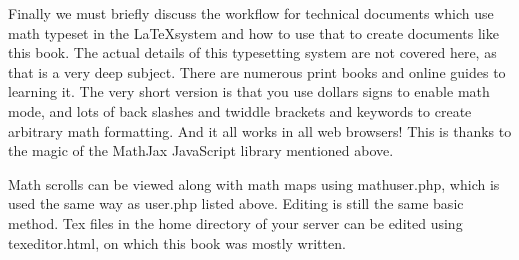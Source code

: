 Finally we must briefly discuss the workflow for technical documents which use math typeset in the \LaTeX system and how to use that to create documents like this book.  The actual details of this typesetting system are not covered here, as that is a very deep subject.  There are numerous print books and online guides to learning it.  The very short version is that you use dollars signs to enable math mode, and lots of back slashes and twiddle brackets and keywords to create arbitrary math formatting.  And it all works in all web browsers! This is thanks to the magic of the MathJax JavaScript library mentioned above.  

Math scrolls can be viewed along with math maps using mathuser.php, which is used the same way as user.php listed above.  Editing is still the same basic method.  Tex files in the home directory of your server can be edited using texeditor.html, on which this book was mostly written.  


